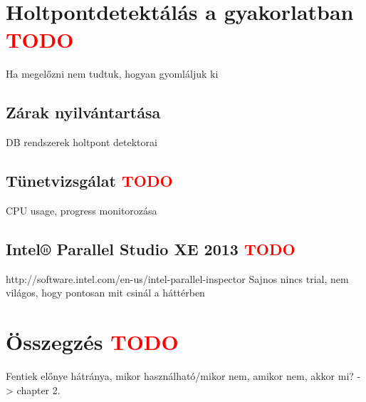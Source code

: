 \section{Holtpontdetektálás a gyakorlatban \textcolor{red}{TODO}} 
\label{sec:dl-avoiding}
Ha megelőzni nem tudtuk, hogyan gyomláljuk ki
    \subsection{Zárak nyilvántartása} DB rendszerek holtpont detektorai
    \subsection{Tünetvizsgálat \textcolor{red}{TODO}} CPU usage, progress monitorozása
    \subsection{Intel® Parallel Studio XE 2013 \textcolor{red}{TODO}} http://software.intel.com/en-us/intel-parallel-inspector Sajnos nincs trial, nem világos, hogy pontosan mit csinál a háttérben
    
\section{Összegzés \textcolor{red}{TODO}} 
Fentiek előnye hátránya, mikor használható/mikor nem, amikor nem, akkor mi? -> chapter 2.
